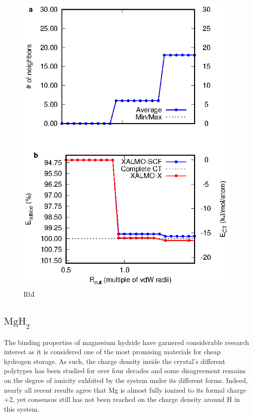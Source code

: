 \documentclass[aps,prb,twocolumn,amsmath,amssymb,superscriptaddress,longbibliography]{revtex4-1}
\begin{document}
\begin{figure}
\includegraphics[scale=1]{./plots/RbI_EvR}
\caption{RbI}
\label{rbi}
\end{figure}




\subsection*{ $\text{MgH}_{2}$ }

The binding properties of magnesium hydride have garnered considerable research interest as it is considered one of the most promising materials for cheap hydrogen storage\cite{Hstorage}.  
As such, the charge density inside the crystal's different polytypes has been studied for over four decades\cite{oldmgh2} and some disagreement remains on the degree of ionicity exhbited by the system under its different forms.  
Indeed, nearly all recent results agree that Mg is almost fully ionized to its formal charge +2, yet consensus still has not been reached on the charge density around H in this system\cite{[conflicting DFT/exp sources]}.
\end{document}
